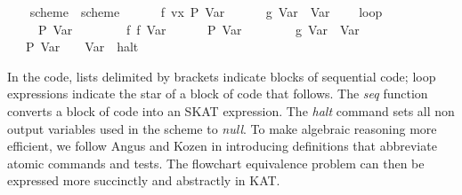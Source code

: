 \documentclass{llncs}
\begin{document}
\begin{isabellebody}
\ \ {}{}\isanewline
\isanewline
{}\isamarkupfalse%
\ scheme{}\ \ {}scheme{}\ {}\isanewline
\ \ {}\ {}\ {}{}\ f\ vx{}\ P\ {}Var\ {}{}\isanewline
\ \ {}\ {}\ {}{}\ g\ {}Var\ {}{}\ {}Var\ {}{}\isanewline
\ \ {}\ loop\isanewline
\ \ \ \ {}\ {}{}P\ {}Var\ {}{}{}\isanewline
\ \ \ \ {}\ {}\ {}{}\ f\ {}f\ {}Var\ {}{}{}\isanewline
\ \ \ \ {}\ P\ {}Var\ {}{}\isanewline
\ \ \ \ {}\ {}\ {}{}\ g\ {}Var\ {}{}\ {}Var\ {}{}\isanewline
\ \ \ \ {}\isanewline
\ \ {}\ P\ {}Var\ {}{}{}\ {}\ {}{}\ Var\ {}{}\ halt\isanewline
\ \ {}{}\isanewline
\end{isabellebody}

\noindent In the code, lists delimited by brackets indicate blocks of
sequential code; loop expressions indicate the star of a block of code
that follows. The \textit{seq} function converts a block of code into
an SKAT expression. The \textit{halt} command sets all non output
variables used in the scheme to\textit{ null}. To make algebraic
reasoning more efficient, we follow Angus and Kozen in introducing
definitions that abbreviate atomic commands and tests. The flowchart
equivalence problem can then be expressed more succinctly and
abstractly in KAT.
\end{document}
